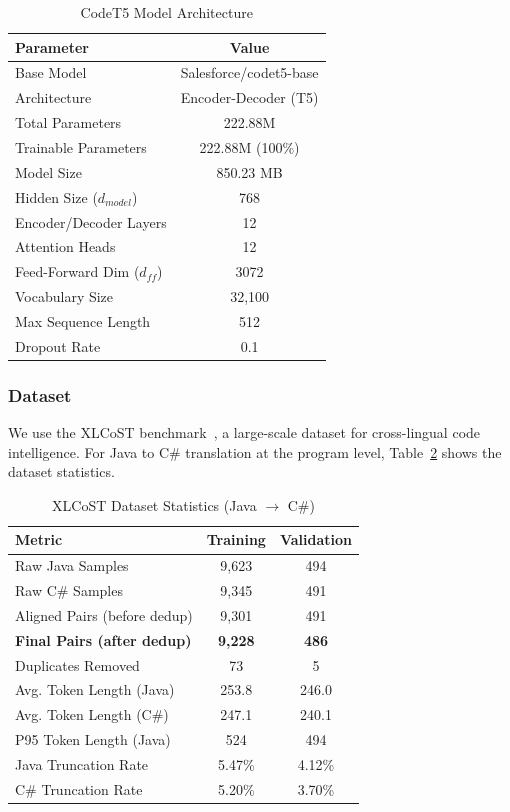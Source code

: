\documentclass[conference]{IEEEtran}
\begin{document}
\begin{table}[htbp]
\caption{CodeT5 Model Architecture}
\begin{center}
\begin{tabular}{|l|c|}
\hline
\textbf{Parameter} & \textbf{Value} \\
\hline
Base Model & Salesforce/codet5-base \\
Architecture & Encoder-Decoder (T5) \\
Total Parameters & 222.88M \\
Trainable Parameters & 222.88M (100\%) \\
Model Size & 850.23 MB \\
Hidden Size ($d_{model}$) & 768 \\
Encoder/Decoder Layers & 12 \\
Attention Heads & 12 \\
Feed-Forward Dim ($d_{ff}$) & 3072 \\
Vocabulary Size & 32,100 \\
Max Sequence Length & 512 \\
Dropout Rate & 0.1 \\
\hline
\end{tabular}
\label{tab:codet5_arch}
\end{center}
\end{table}

\subsubsection{Dataset}
We use the XLCoST benchmark~\cite{xlcost2022}, a large-scale dataset for cross-lingual code intelligence. For Java to C\# translation at the program level, Table~\ref{tab:xlcost_data} shows the dataset statistics.

\begin{table}[htbp]
\caption{XLCoST Dataset Statistics (Java $\rightarrow$ C\#)}
\begin{center}
\begin{tabular}{|l|c|c|}
\hline
\textbf{Metric} & \textbf{Training} & \textbf{Validation} \\
\hline
Raw Java Samples & 9,623 & 494 \\
Raw C\# Samples & 9,345 & 491 \\
Aligned Pairs (before dedup) & 9,301 & 491 \\
\textbf{Final Pairs (after dedup)} & \textbf{9,228} & \textbf{486} \\
Duplicates Removed & 73 & 5 \\
\hline
Avg. Token Length (Java) & 253.8 & 246.0 \\
Avg. Token Length (C\#) & 247.1 & 240.1 \\
P95 Token Length (Java) & 524 & 494 \\
Java Truncation Rate & 5.47\% & 4.12\% \\
C\# Truncation Rate & 5.20\% & 3.70\% \\
\hline
\end{tabular}
\label{tab:xlcost_data}
\end{center}
\end{table}
\end{document}
